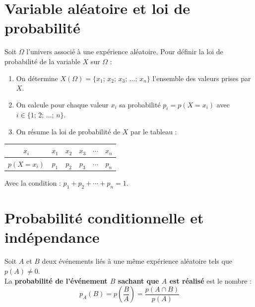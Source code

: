 \section{Variable al\'{e}atoire et loi de probabilit\'{e}}

\begin{definition}
Soit $\Omega$ l'univers associ\'{e} \`{a} une exp\'{e}rience al\'{e}atoire.
Pour d\'{e}finir la loi de probabilit\'{e} de la variable $X$ sur $\Omega$ :
\begin{enumerate}[label=\textbf{\arabic*.}, itemsep=2pt]
  \item On d\'{e}termine $X(\Omega) = \{x_1;\,x_2;\,x_3;\,\ldots;\,x_n\}$
        l'ensemble des valeurs prises par $X$.
  \item On calcule pour chaque valeur $x_i$ sa probabilit\'{e}
        $p_i = p(X = x_i)$ avec $i \in \{1;\,2;\,\ldots;\,n\}$.
  \item On r\'{e}sume la loi de probabilit\'{e} de $X$ par le tableau :
\end{enumerate}

\medskip
\begin{center}
\renewcommand{\arraystretch}{1.5}
\begin{tabular}{|c|c|c|c|c|c|}
  \hline
  \rowcolor{navylight}
  $x_i$ & $x_1$ & $x_2$ & $x_3$ & $\cdots$ & $x_n$ \\
  \hline
  $p(X = x_i)$ & $p_1$ & $p_2$ & $p_3$ & $\cdots$ & $p_n$ \\
  \hline
\end{tabular}
\end{center}

\medskip
\noindent Avec la condition : $p_1 + p_2 + \cdots + p_n = 1$.
\end{definition}

\section{Probabilit\'{e} conditionnelle et ind\'{e}pendance}

\begin{definition}
Soit $A$ et $B$ deux \'{e}v\'{e}nements li\'{e}s \`{a} une m\^{e}me exp\'{e}rience al\'{e}atoire
tels que $p(A) \neq 0$.\\
La \textbf{probabilit\'{e} de l'\'{e}v\'{e}nement $B$ sachant que $A$ est r\'{e}alis\'{e}}
est le nombre :
\[
  p_A(B) = p\!\left(\frac{B}{A}\right) = \frac{p(A \cap B)}{p(A)}
\]
\end{definition}

